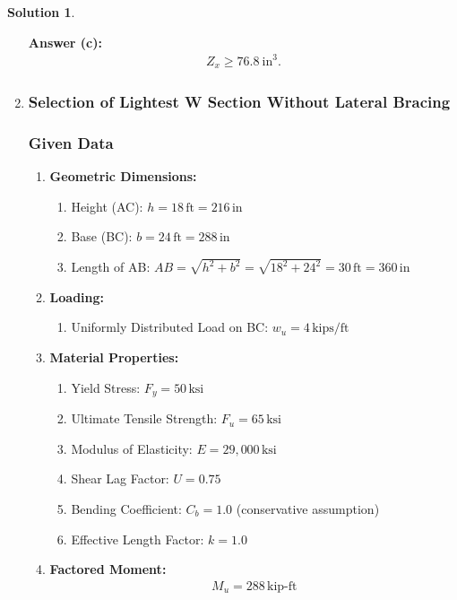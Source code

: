 \documentclass[12pt]{article}
\theoremstyle{definition} %
\newtheorem{solution}{Solution}
\theoremstyle{plain} %
\begin{document}
\begin{solution}
\begin{enumerate}
\noindent\textbf{Answer (c):}
\begin{align}
\boxed{Z_x \geq 76.8~\text{in}^3}.
\end{align}

\hrulefill

\item \subsubsection*{Selection of Lightest W Section Without Lateral Bracing}

\subsubsection*{Given Data}
\begin{enumerate}
    \item \textbf{Geometric Dimensions:}
    \begin{enumerate}
        \item Height (AC): $h = 18 \, \text{ft} = 216 \, \text{in}$
        \item Base (BC): $b = 24 \, \text{ft} = 288 \, \text{in}$
        \item Length of AB: $AB = \sqrt{h^2 + b^2} = \sqrt{18^2 + 24^2} = 30 \, \text{ft} = 360 \, \text{in}$
    \end{enumerate}
    \item \textbf{Loading:}
    \begin{enumerate}
        \item Uniformly Distributed Load on BC: $w_u = 4 \, \text{kips/ft}$
    \end{enumerate}
    \item \textbf{Material Properties:}
    \begin{enumerate}
        \item Yield Stress: $F_y = 50 \, \text{ksi}$
        \item Ultimate Tensile Strength: $F_u = 65 \, \text{ksi}$
        \item Modulus of Elasticity: $E = 29,000 \, \text{ksi}$
        \item Shear Lag Factor: $U = 0.75$
        \item Bending Coefficient: $C_b = 1.0$ (conservative assumption)
        \item Effective Length Factor: $k = 1.0$
    \end{enumerate}
    \item \textbf{Factored Moment:}
    \begin{align}
    M_u = 288 \, \text{kip-ft}
    \end{align}
\end{enumerate}


\end{enumerate}
\end{solution}
\end{document}
